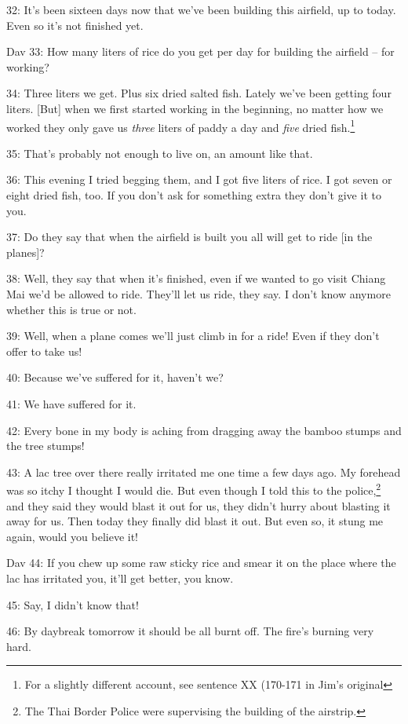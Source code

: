 32: It's been sixteen days now that we've been building this airfield, up to today.
Even so it's not finished yet.

Dav 33: How many liters of rice do you get per day for building the airfield --
for working?

34: Three liters we get. Plus six dried salted fish. Lately we've been getting
four liters. [But] when we first started working in the beginning, no matter how
we worked they only gave us \textit{three} liters of paddy a day and \textit{five}
dried fish.\footnote{For a slightly different account, see sentence XX (170-171 in Jim's original}

35: That's probably not enough to live on, an amount like that.

36: This evening I tried begging them, and I got five liters of rice. I got seven
or eight dried fish, too. If you don't ask for something extra they don't give
it to you.

37: Do they say that when the airfield is built you all will get to ride [in the
planes]?

38: Well, they say that when it's finished, even if we wanted to go visit Chiang
Mai we'd be allowed to ride. They'll let us ride, they say. I don't know anymore
whether this is true or not.

39: Well, when a plane comes we'll just climb in for a ride! Even if they don't
offer to take us!

40: Because we've suffered for it, haven't we?

41: We have suffered for it.

42: Every bone in my body is aching from dragging away the bamboo stumps and the
tree stumps!

43: A lac tree over there really irritated me one time a few days ago. My forehead
was so itchy I thought I would die. But even though I told this to the police,\footnote{The Thai Border Police were supervising the building of the airstrip.}
and they said they would blast it out for us, they didn't hurry about blasting
it away for us. Then today they finally did blast it out. But even so, it stung
me again, would you believe it!

Dav 44: If you chew up some raw sticky rice and smear it on the place where the
lac has irritated you, it'll get better, you know.

45: Say, I didn't know that!

46: By daybreak tomorrow it should be all burnt off. The fire's burning very hard.

